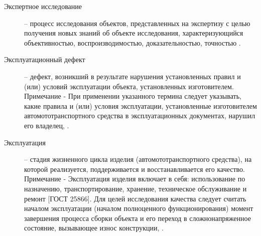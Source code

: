 \begin{description}
	\item[Экспертное исследование] -- процесс исследования объектов, представленных на экспертизу с целью получения новых знаний об объекте исследования, характеризующийся объективностью, воспроизводимостью, доказательностью, точностью  \cite[п.3.74]{271022021:gost}.
	
%	
	
	
	
	\item
	[Эксплуатационный дефект] -- дефект, возникший в результате нарушения установленных правил и (или) условий эксплуатации объекта, установленных изготовителем. Примечание - При применении указанного термина следует указывать, какие правила и (или) условия эксплуатации, установленные изготовителем автомототранспортного средства в эксплуатационных документах, нарушил его владелец, \cite[п.76]{271022021:gost}.
	
	\item
	[Эксплуатация] -- стадия жизненного цикла изделия (автомототранспортного средства), на которой реализуется, поддерживается и восстанавливается его качество. Примечание - Эксплуатация изделия включает в себя: использование по назначению, транспортирование, хранение, техническое обслуживание и ремонт [ГОСТ 25866]. Для целей исследования качества следует считать началом эксплуатации (началом полноценного функционирования) момент завершения процесса сборки объекта и его переход в сложнонапряженное состояние, вызывающее износ конструкции, \cite[3.77]{271022021:gost}.
	

\end{description}
